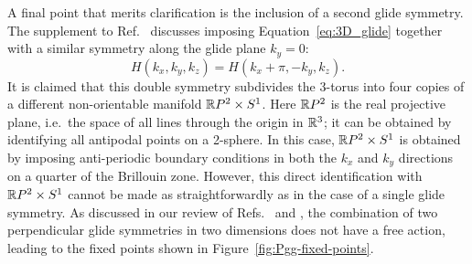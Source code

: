 A final point that merits clarification is the inclusion of a second glide symmetry. The supplement to Ref.~\cite{Fonseca-Vaidya_nonorientable} discusses imposing Equation~\eqref{eq:3D_glide} together with a similar symmetry along the glide plane $k_y = 0$:
\begin{equation}
	H(k_x, k_y, k_z) = H(k_x + \pi, -k_y, k_z).
\end{equation}
It is claimed that this double symmetry subdivides the 3-torus into four copies of a different non-orientable manifold $\mathbb{R} P^2\times S^1$. Here $\mathbb{R} P^2$ is the real projective plane, i.e.\ the space of all lines through the origin in $\mathbb{R}^3$; it can be obtained by identifying all antipodal points on a 2-sphere. In this case, $\mathbb{R} P^2\times S^1$ is obtained by imposing anti-periodic boundary conditions in both the $k_x$ and $k_y$ directions on a quarter of the Brillouin zone. However, this direct identification with $\mathbb{R} P^2\times S^1$ cannot be made as straightforwardly as in the case of a single glide symmetry. As discussed in our review of Refs.~\cite{HZY_RP2} and \cite{WangZhang_acoustic-Klein-2D}, the combination of two perpendicular glide symmetries in two dimensions does not have a free action, leading to the fixed points shown in Figure~\ref{fig:Pgg-fixed-points}.

